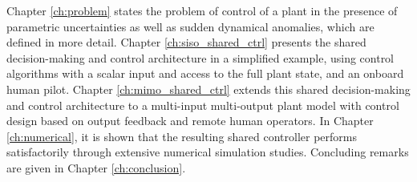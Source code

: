 Chapter \ref{ch:problem} states the problem of control of a plant in the presence of parametric uncertainties as well as sudden dynamical anomalies, which are defined in more detail. Chapter \ref{ch:siso_shared_ctrl} presents the shared decision-making and control architecture in a simplified example, using control algorithms with a scalar input and access to the full plant state, and an onboard human pilot. Chapter \ref{ch:mimo_shared_ctrl} extends this shared decision-making and control architecture to a multi-input multi-output plant model with control design based on output feedback and remote human operators. In Chapter \ref{ch:numerical}, it is shown that the resulting shared controller performs satisfactorily through extensive numerical simulation studies. Concluding remarks are given in Chapter \ref{ch:conclusion}.

